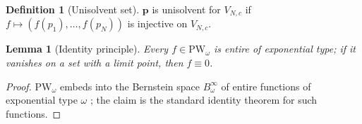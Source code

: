 \documentclass[12pt,a4paper]{amsart}
\newtheorem{lemma}[theorem]{Lemma}
\theoremstyle{definition}
\newtheorem{definition}[theorem]{Definition}
\newcommand{\PW}{\mathrm{PW}_\omega}
\begin{document}
\begin{definition}[Unisolvent set]
$\mathbf{p}$ is unisolvent for $V_{N,c}$ if
$f\mapsto(f(p_1),\dots,f(p_N))$ is injective on $V_{N,c}$.
\end{definition}

\begin{lemma}[Identity principle]\label{lem:identity}
Every $f\in\PW$ is entire of exponential type; if it vanishes on a set
with a limit point, then $f\equiv 0$.
\end{lemma}
\begin{proof}
$\PW$ embeds into the Bernstein space $B_\omega^\infty$ of entire
functions of exponential type $\omega$ \cite[Ch.~6]{BonamiKaroui};
the claim is the standard identity theorem for such functions.
\end{proof}
\end{document}
